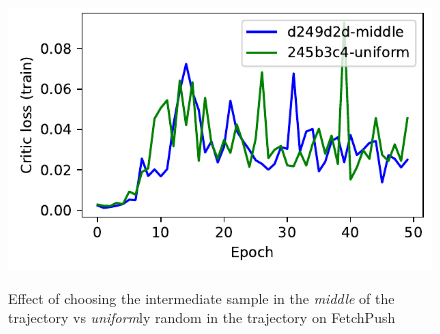 \begin{figure}
  \includegraphics[width=\frac\columnwidth]{media/res/d249d2d-c9bfa98b-FetchPush-v1-fwrl-future/train/critic_loss.pdf}%
  \label{fig:middle-vs-uniform}%
  \caption{Effect of choosing the intermediate sample in the \emph{middle} of the
    trajectory vs \emph{uniform}ly random in the trajectory on FetchPush}%
\end{figure}%
% 

%
%
%
%
%
